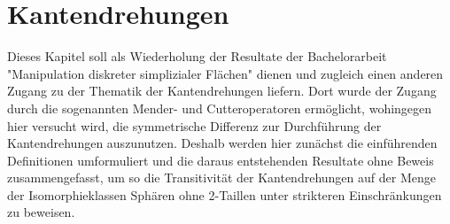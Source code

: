 \documentclass[12pt,titlepage,twoside,cleardoublepage]{article}
\theoremstyle{nummermitklammern}
\numberwithin{equation}{section}
\begin{document}
 \section{Kantendrehungen}\label{edget}
Dieses Kapitel soll als Wiederholung der Resultate der Bachelorarbeit "Manipulation diskreter simplizialer Flächen"  dienen und zugleich einen anderen Zugang zu der Thematik der Kantendrehungen liefern. Dort wurde der Zugang durch die sogenannten Mender- und Cutteroperatoren ermöglicht, wohingegen hier versucht wird, die symmetrische Differenz zur Durchführung der Kantendrehungen auszunutzen. Deshalb werden hier zunächst die einführenden Definitionen umformuliert und die daraus entstehenden Resultate ohne Beweis zusammengefasst, um so die Transitivität der Kantendrehungen auf der Menge der Isomorphieklassen Sphären ohne 2-Taillen unter strikteren Einschränkungen zu beweisen. 
\end{document}
